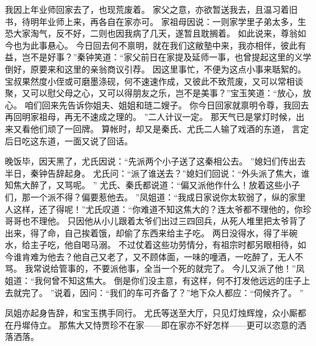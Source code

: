 我因上年业师回家去了，也现荒废着。
家父之意，亦欲暂送我去，且温习着旧书，待明年业师上来，再各自在家亦可。
家祖母因说：一则家学里子弟太多，生恐大家淘气，反不好，二则也因我病了几天，遂暂且耽搁着。
如此说来，尊翁如今也为此事悬心。
今日回去何不禀明，就在我们这敝塾中来，我亦相伴，彼此有益，岂不是好事？”秦钟笑道：“家父前日在家提及延师一事，也曾提起这里的义学倒好，原要来和这里的亲翁商议引荐。
因这里事忙，不便为这点小事来聒絮的。
宝叔果然度小侄或可磨墨涤砚，何不速速作成，又彼此不致荒废，又可以常相谈聚，又可以慰父母之心，又可以得朋友之乐，岂不是美事？”宝玉笑道：“放心，放心。
咱们回来先告诉你姐夫、姐姐和琏二嫂子。
你今日回家就禀明令尊，我回去再回明家祖母，再无不速成之理的。
”二人计议一定。
那天气已是掌灯时候，出来又看他们顽了一回牌。
算帐时，却又是秦氏、尤氏二人输了戏酒的东道，
言定后日吃这东道，一面又说了回话。
\par
晚饭毕，因天黑了，尤氏因说：“先派两个小子送了这秦相公去。
”媳妇们传出去半日，秦钟告辞起身。
尤氏问：“派了谁送去？”媳妇们回说：“外头派了焦大，谁知焦大醉了，又骂呢。
”
尤氏、秦氏都说道：“偏又派他作什么！放着这些小子们，那一个派不得？偏要惹他去。
”凤姐道：“我成日家说你太软弱了，纵的家里人这样，还了得呢！”尤氏叹道：“你难道不知这焦大的？连太爷都不理他的，你珍哥哥也不理他。
只因他从小儿跟着太爷们出过三四回兵，从死人堆里把太爷背了出来，得了命，自己挨着饿，却偷了东西来给主子吃。
两日没得水，得了半碗水，给主子吃，他自喝马溺。
不过仗着这些功劳情分，有祖宗时都另眼相待，如今谁肯难为他去？他自己又老了，又不顾体面，一味的噇酒，一吃醉了，无人不骂。
我常说给管事的，不要派他事，全当一个死的就完了。
今儿又派了他！”凤姐道：“我何曾不知这焦大。
倒是你们没主意，有这样，何不打发他远远的庄子上去就完了。
”说着，因问：“我们的车可齐备了？”地下众人都应：“伺候齐了。
”\par
凤姐亦起身告辞，和宝玉携手同行。
尤氏等送至大厅，只见灯烛辉煌，众小厮都在丹墀侍立。
那焦大又恃贾珍不在家——即在家亦不好怎样——更可以恣意的洒落洒落。
